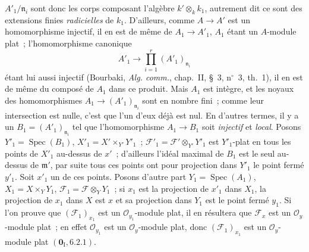 $A'_1/\mathfrak n_i$ sont donc les corps composant l'algèbre
$k'\otimes_k k_1$, autrement dit ce sont des extensions finies
\emph{radicielles} de $k_1$. D'ailleurs, comme $A\to A'$ est un homomorphisme
injectif, il en est de même de $A_1\to A'_1$, $A_1$ étant un $A$-module plat~;
l'homomorphisme canonique
\[
A'_1\longrightarrow\prod_{i=1}^{r}(A'_1)_{\mathfrak n_i}
\]
étant lui aussi injectif (Bourbaki, \emph{Alg. comm.}, chap.~II, \S~3,
n$^\circ$~3, th.~1), il en est de même du composé de $A_1$ dans ce produit.
Mais $A_1$ est intègre, et les noyaux des homomorphismes
$A_1\to(A'_1)_{\mathfrak n_i}$ sont en nombre fini~; comme leur intersection
est nulle, c'est que l'un d'eux déjà est nul. En d'autres termes, il y a un
$B_1=(A'_1)_{\mathfrak n_i}$ tel que l'homomorphisme $A_1\to B_1$ soit
\emph{injectif} et \emph{local}. Posons $Y'_1=\operatorname{Spec}(B_1)$,
$X'_1=X'\times_{Y'}Y'_1$~; $\mathcal F'_1=\mathcal F'\otimes_{Y'}Y'_1$ est
$Y'_1$-plat en tous les points de $X'_1$ au-dessus de $x'$~; d'ailleurs l'idéal
maximal de $B_1$ est le seul au-dessus de $\mathfrak m'$, par suite tous ces
points ont pour projection dans $Y'_1$ le point fermé $y'_1$. Soit $x'_1$ un de
ces points. Posons d'autre part $Y_1=\operatorname{Spec}(A_1)$,
$X_1=X\times_Y Y_1$, $\mathcal F_1=\mathcal F\otimes_Y Y_1$~; si $x_1$ est la
projection de $x'_1$ dans $X_1$, la projection de $x_1$ dans $X$ est $x$ et sa
projection dans $Y_1$ est le point fermé $y_1$. Si l'on prouve que
$(\mathcal F_1)_{x_1}$ est un $\mathcal O_{y_1}$-module plat, il en résultera
que $\mathcal F_x$ est un $\mathcal O_y$-module plat~; en effet
$\mathcal O_{y_1}$ est un $\mathcal O_y$-module plat, donc
$(\mathcal F_1)_{x_1}$ est un $\mathcal O_y$-module plat
$(\mathbf 0_{\mathrm I},6.2.1)$.


